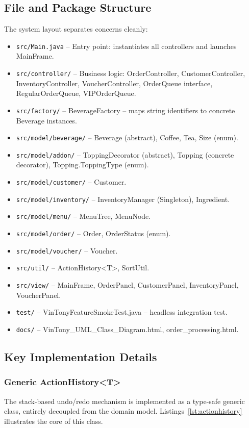 \documentclass[11pt,a4paper]{article}
\begin{document}
\subsection{File and Package Structure}
The system layout separates concerns cleanly:
\begin{itemize}[noitemsep,topsep=3pt,leftmargin=*]
    \item \texttt{src/Main.java} -- Entry point: instantiates all controllers and launches MainFrame.
    \item \texttt{src/controller/} -- Business logic: OrderController, CustomerController, InventoryController, VoucherController, OrderQueue interface, RegularOrderQueue, VIPOrderQueue.
    \item \texttt{src/factory/} -- BeverageFactory -- maps string identifiers to concrete Beverage instances.
    \item \texttt{src/model/beverage/} -- Beverage (abstract), Coffee, Tea, Size (enum).
    \item \texttt{src/model/addon/} -- ToppingDecorator (abstract), Topping (concrete decorator), Topping.ToppingType (enum).
    \item \texttt{src/model/customer/} -- Customer.
    \item \texttt{src/model/inventory/} -- InventoryManager (Singleton), Ingredient.
    \item \texttt{src/model/menu/} -- MenuTree, MenuNode.
    \item \texttt{src/model/order/} -- Order, OrderStatus (enum).
    \item \texttt{src/model/voucher/} -- Voucher.
    \item \texttt{src/util/} -- ActionHistory<T>, SortUtil.
    \item \texttt{src/view/} -- MainFrame, OrderPanel, CustomerPanel, InventoryPanel, VoucherPanel.
    \item \texttt{test/} -- VinTonyFeatureSmokeTest.java -- headless integration test.
    \item \texttt{docs/} -- VinTony\_UML\_Class\_Diagram.html, order\_processing.html.
\end{itemize}

\subsection{Key Implementation Details}

\subsubsection{Generic ActionHistory<T>}
The stack-based undo/redo mechanism is implemented as a type-safe generic class, entirely decoupled from the domain model. Listings~\ref{lst:actionhistory} illustrates the core of this class.
\end{document}
